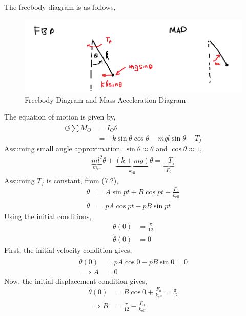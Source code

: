 \subsection{}
The freebody diagram is as follows,
\begin{figure}[H]
    \centering
    \includegraphics[width=0.8\linewidth]{Questions/Figures/Q5 FBD and MAD.png}
    \caption{Freebody Diagram and Mass Acceleration Diagram}
\end{figure}
The equation of motion is given by,
\begin{align*}
    \circlearrowleft \sum M_{O} &= I_O \ddot{\theta} \\
    &= -k \sin\theta \cos\theta - mgl \sin\theta - T_f 
\end{align*}
Assuming small angle approximation, $\sin\theta \approx \theta$ and $\cos\theta \approx 1$,
\begin{align*}
    \underbrace{ml^2}_{m_{\text{eff}}} \ddot{\theta} + \underbrace{\left(k + mg\right)}_{k_{\text{eff}}} \theta = \underbrace{-T_f}_{F_0}
\end{align*}
Assuming $T_f$ is constant, from (7.2),
\begin{align*}
    \theta &= A \sin pt + B \cos pt + \frac{F_0}{k_{\text{eff}}} \\
    \dot{\theta} &= pA \cos pt - pB \sin pt
\end{align*}
Using the initial conditions,
\begin{align*}
    \theta(0) &= \frac{\pi}{12} \\
    \dot{\theta}(0) &= 0 
\end{align*}
First, the initial velocity condition gives,
\begin{align*}
    \dot{\theta}(0) &= pA \cos 0 - pB \sin 0 = 0 \\
    \implies A &= 0
\end{align*}
Now, the initial displacement condition gives,
\begin{align*}
    \theta(0) &= B \cos 0 + \frac{F_0}{k_{\text{eff}}} = \frac{\pi}{12} \\
    \implies B &= \frac{\pi}{12} - \frac{F_0}{k_{\text{eff}}}
\end{align*}
